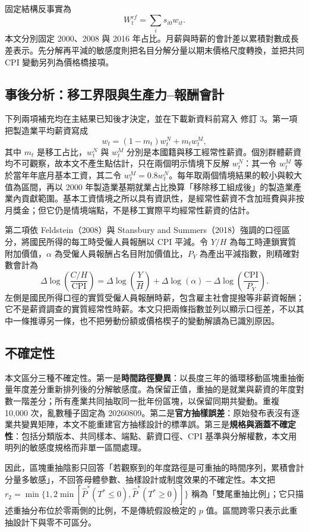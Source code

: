 \documentclass[12pt]{article}
\begin{document}
固定結構反事實為
\[
W_t^{cf}=\sum_i s_{i0}w_{it}.
\]
本文分別固定 2000、2008 與 2016 年占比。月薪與時薪的會計差以累積對數成長差表示。先分解再平減的敏感度則把名目分解分量以期末價格尺度轉換，並把共同 CPI 變動另列為價格橋接項。

\subsection{事後分析：移工界限與生產力--報酬會計}

下列兩項補充均在主結果已知後才決定，並在下載新資料前寫入  修訂 3。第一項把製造業平均薪資寫成
\[
w_t=(1-m_t)w_t^{N}+m_tw_t^{M},
\]
其中 $m_t$ 是移工占比，$w_t^N$ 與 $w_t^M$ 分別是本國籍與移工經常性薪資。個別群體薪資均不可觀察，故本文不產生點估計，只在兩個明示情境下反解 $w_t^N$：其一令 $w_t^M$ 等於當年年底月基本工資，其二令 $w_t^M=0.8w_t^N$。每年取兩個情境結果的較小與較大值為區間，再以 2000 年製造業基期就業占比換算「移除移工組成後」的製造業產業內貢獻範圍。基本工資情境之所以具有資訊性，是經常性薪資不含加班費與非按月獎金；但它仍是情境端點，不是移工實際平均經常性薪資的估計。

第二項依 Feldstein（2008）與 Stansbury and Summers（2018）強調的口徑區分\citep{feldstein2008,stansbury-summers2018}，將國民所得的每工時受僱人員報酬以 CPI 平減。令 $Y/H$ 為每工時連鎖實質附加價值，$\alpha$ 為受僱人員報酬占名目附加價值比，$P_Y$ 為產出平減指數，則精確對數會計為
\[
\Delta\log\!\left(\frac{C/H}{\mathrm{CPI}}\right)
=\Delta\log\!\left(\frac{Y}{H}\right)
+\Delta\log(\alpha)
-\Delta\log\!\left(\frac{\mathrm{CPI}}{P_Y}\right).
\]
左側是國民所得口徑的實質受僱人員報酬時薪，包含雇主社會提撥等非薪資報酬；它不是薪資調查的實質經常性時薪。本文只把兩條指數並列以顯示口徑差，不以其中一條推導另一條，也不把勞動份額或價格楔子的變動解讀為已識別原因。

\subsection{不確定性}

本文區分三種不確定性。第一是\textbf{時間路徑變異}：以長度三年的循環移動區塊重抽衡量年度差分重新排列後的分解敏感度。為保留正值，重抽的是就業與薪資的年度對數一階差分；所有產業共同抽取同一批年份區塊，以保留同期共變動。重複 10,000 次，亂數種子固定為 20260809。第二是\textbf{官方抽樣誤差}：原始發布表沒有逐業共變異矩陣，本文不能重建官方抽樣設計的標準誤。第三是\textbf{規格與涵蓋不確定性}：包括分類版本、共同樣本、端點、薪資口徑、CPI 基準與分解權數，本文用明列的敏感度規格而非單一區間處理。

因此，區塊重抽陰影只回答「若觀察到的年度路徑是可重抽的時間序列，累積會計分量多敏感」，不回答母體參數、抽樣設計或制度效果的不確定性。本文把 $r_2=\min\{1,2\min[\widehat P^*(T^*\leq0),\widehat P^*(T^*\geq0)]\}$ 稱為「雙尾重抽比例」；它只描述重抽分布位於零兩側的比例，不是傳統假設檢定的 $p$ 值。區間跨零只表示此重抽設計下與零不可區分。
\end{document}

